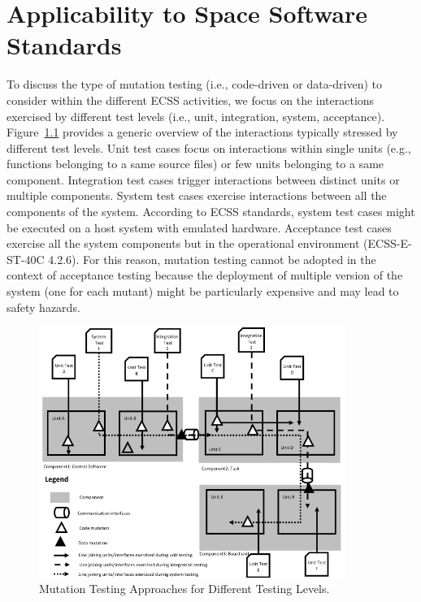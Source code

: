 
\chapter{Applicability to Space Software Standards}

To discuss the type of mutation testing (i.e., code-driven or data-driven) to consider within the different ECSS activities, we focus on the interactions exercised by different test levels (i.e., unit, integration, system, acceptance).  Figure~\ref{fig:mutationTestingVSTestingLevels} provides a generic overview of the interactions typically stressed by different test levels. Unit test cases focus on interactions within single units (e.g., functions belonging to a same source files) or few units belonging to a same component. Integration test cases trigger interactions between distinct units or multiple components. System test cases exercise interactions between all the components of the system. According to ECSS standards, system test cases might be executed on a host system with emulated hardware. Acceptance test cases exercise all the system components but in the operational environment (ECSS-E-ST-40C 4.2.6). For this reason, mutation testing cannot be adopted in the context of acceptance testing because the deployment of multiple version of the system (one for each mutant) might be particularly expensive and may lead to safety hazards.
 
 
\begin{figure}[h]
  \centering
    \includegraphics[width=10cm]{images/TestingLevels}
      \caption{Mutation Testing Approaches for Different Testing Levels.}
      \label{fig:mutationTestingVSTestingLevels}
\end{figure} 

